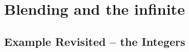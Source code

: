 \section{Blending and the infinite}
\label{sec:infinity}



%
%




\subsection{Example Revisited -- the Integers}

